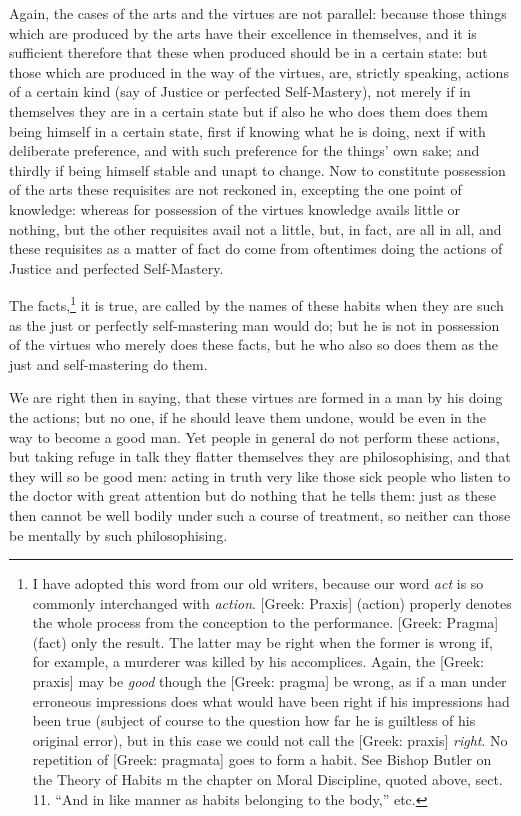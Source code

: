 Again, the cases of the arts and the virtues are not parallel: because those
things which are produced by the arts have their excellence in themselves, and
it is sufficient therefore that these when produced should be in a certain
state: but those which are produced in the way of the virtues, are, strictly
speaking, actions of a certain kind (say of Justice or perfected Self-Mastery),
not merely if in themselves they are in a certain state but if also he who does
them does them being himself in a certain state, first if knowing what he is
doing, next if with deliberate preference, and with such preference for the
things’ own sake; and thirdly if being himself stable and unapt to
change. Now to constitute possession of the arts these requisites are not
reckoned in, excepting the one point of knowledge: whereas for possession of
the virtues knowledge avails little or nothing, but the other requisites avail
not a little, but, in fact, are all in all, and these requisites as a matter of
fact do come from oftentimes doing the actions of Justice and perfected
Self-Mastery.

The facts,\footnote{I have adopted this word from our old writers, because our word \emph{act} is
so commonly interchanged with \emph{action}. [Greek: Praxis] (action) properly
denotes the whole process from the conception to the performance. [Greek:
Pragma] (fact) only the result. The latter may be right when the former is
wrong if, for example, a murderer was killed by his accomplices. Again, the
[Greek: praxis] may be \emph{good} though the [Greek: pragma] be wrong, as if a
man under erroneous impressions does what would have been right if his
impressions had been true (subject of course to the question how far he is
guiltless of his original error), but in this case we could not call the
[Greek: praxis] \emph{right}. No repetition of [Greek: pragmata] goes to form a
habit. See Bishop Butler on the Theory of Habits m the chapter on Moral
Discipline, quoted above, sect. 11. “And in like manner as habits
belonging to the body,” etc.}
it is true, are called by the names of these habits when they are such as the
just or perfectly self-mastering man would do; but he is not in possession of
the virtues who merely does these facts, but he who also so does them as the
just and self-mastering do them.

We are right then in saying, that these virtues are formed in a man by his
doing the actions; but no one, if he should leave them undone, would be even in
the way to become a good man. Yet people in general do not perform these
actions, but taking refuge in talk they flatter themselves they are
philosophising, and that they will so be good men: acting in truth very like
those sick people who listen to the doctor with great attention but do nothing
that he tells them: just as these then cannot be well bodily under such a
course of treatment, so neither can those be mentally by such philosophising.

